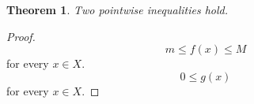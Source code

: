 \documentclass{article}
\newtheorem{theorem}{Theorem}
\begin{document}
\begin{theorem}\label{thm:trailing-binders}
Two pointwise inequalities hold.
\end{theorem}
\begin{proof}
\[
  m \le f(x) \le M
\]
for every $x\in X$.
\[
  0 \le g(x)
\]
for every $x\in X$.
\end{proof}
\end{document}
